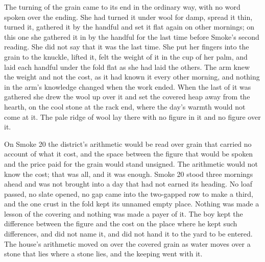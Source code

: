 The turning of the grain came to its end in the ordinary way, with no word spoken over the ending. She had turned it under wool for damp, spread it thin, turned it, gathered it by the handful and set it flat again on other mornings; on this one she gathered it in by the handful for the last time before Smoke's second reading. She did not say that it was the last time. She put her fingers into the grain to the knuckle, lifted it, felt the weight of it in the cup of her palm, and laid each handful under the fold flat as she had laid the others. The arm knew the weight and not the cost, as it had known it every other morning, and nothing in the arm's knowledge changed when the work ended. When the last of it was gathered she drew the wool up over it and set the covered heap away from the hearth, on the cool stone at the rack end, where the day's warmth would not come at it. The pale ridge of wool lay there with no figure in it and no figure over it.

On Smoke 20 the district's arithmetic would be read over grain that carried no account of what it cost, and the space between the figure that would be spoken and the price paid for the grain would stand unsigned. The arithmetic would not know the cost; that was all, and it was enough. Smoke 20 stood three mornings ahead and was not brought into a day that had not earned its heading. No loaf passed, no slate opened, no gap came into the two-gapped row to make a third, and the one crust in the fold kept its unnamed empty place. Nothing was made a lesson of the covering and nothing was made a payer of it. The boy kept the difference between the figure and the cost on the place where he kept such differences, and did not name it, and did not hand it to the yard to be entered. The house's arithmetic moved on over the covered grain as water moves over a stone that lies where a stone lies, and the keeping went with it.

\scenebreak

